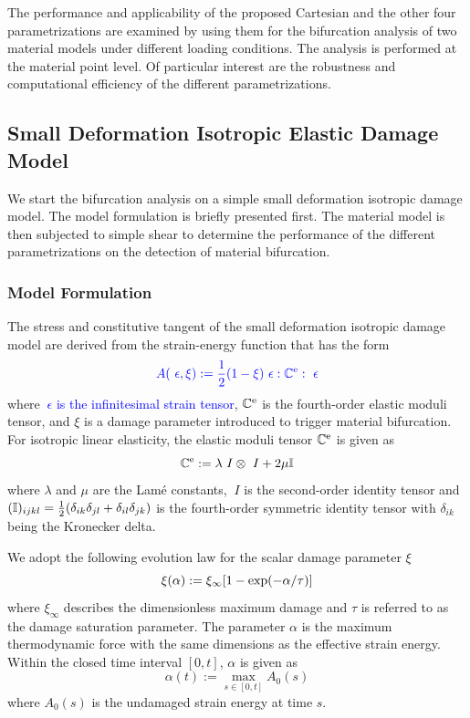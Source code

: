 \documentclass[12pt]{article}
\numberwithin{equation}{section}
\begin{document}
The performance and applicability of the proposed Cartesian and the
other four parametrizations are examined by using them for the
bifurcation analysis of two material models under different loading
conditions. The analysis is performed at the material point level. Of
particular interest are the robustness and computational efficiency of
the different parametrizations.

\subsection{Small Deformation Isotropic Elastic Damage Model}
\label{subsec:isotropic}

We start the bifurcation analysis on a simple small deformation
isotropic damage model. The model formulation is briefly presented
first. The material model is then subjected to simple shear to
determine the performance of the different parametrizations on the
detection of material bifurcation.

\subsubsection{Model Formulation}

The stress and constitutive tangent of the small deformation isotropic
damage model are derived from the strain-energy function that has the
form
\begin{equation}\label{eq:iso-psi}
\color{blue}
  A(~\epsilon, \xi)
  :=
  \frac{1}{2} (1 - \xi)
  ~\epsilon : \mathbb{C}^{\text{e}} : ~\epsilon
\end{equation}
where \textcolor{blue}{$~\epsilon$ is the infinitesimal strain tensor},
$\mathbb{C}^{\text{e}}$ is the fourth-order elastic moduli tensor, and $\xi$ is a
damage parameter introduced to trigger material bifurcation. For
isotropic linear elasticity, the elastic moduli tensor $\mathbb{C}^{\text{e}}$ is
given as
\begin{equation}
  \mathbb{C}^{\text{e}} := \lambda ~I \otimes ~I + 2\mu \mathbb{I}
\end{equation}
where $\lambda$ and $\mu$ are the Lam\'{e} constants, $~I$ is the
second-order identity tensor and $(\mathbb{I})_{ijkl} =
\frac{1}{2}(\delta_{ik}\delta_{jl} + \delta_{il}\delta_{jk})$ is the
fourth-order symmetric identity tensor with $\delta_{ik}$ being the
Kronecker delta.

We adopt the following evolution law for the scalar damage parameter $
\xi$ \citep{Holzapfel:2000}
\begin{equation}\label{eq:iso-xi}
  \xi(\alpha) := \xi_{\infty} [ 1- {\rm exp}(-\alpha / \tau)]
\end{equation}
where $\xi_{\infty}$ describes the dimensionless maximum damage and
$\tau$ is referred to as the damage saturation parameter. The
parameter $\alpha$ is the maximum thermodynamic force
\citep{Holzapfel:2000} with the same dimensions as the effective strain
energy. Within the closed time interval $[0,t]$, $\alpha$ is given as
\begin{equation}\label{eq:alpha}
  \alpha(t) := \max_{s\in [0,t]}A_0(s)
\end{equation}
where $A_0(s)$ is the undamaged strain energy at time $s$.
\end{document}
